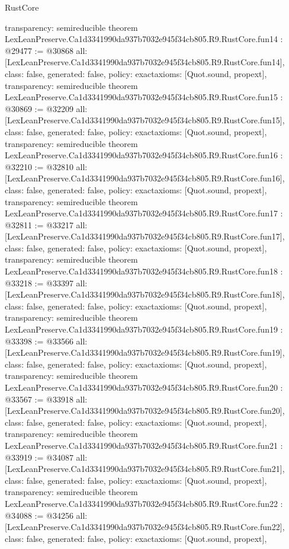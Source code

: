 \begin{lexlean}{RustCore}
\begin{coremodule}
{  transparency: semireducible
}
theorem LexLeanPreserve.Ca1d3341990da937b7032e945f34cb805.R9.RustCore.fun14 : @29477 := @30868 {
  all: [LexLeanPreserve.Ca1d3341990da937b7032e945f34cb805.R9.RustCore.fun14],
  class: false,
  generated: false,
  policy: exact{axioms: [Quot.sound, propext]},
  transparency: semireducible
}
theorem LexLeanPreserve.Ca1d3341990da937b7032e945f34cb805.R9.RustCore.fun15 : @30869 := @32209 {
  all: [LexLeanPreserve.Ca1d3341990da937b7032e945f34cb805.R9.RustCore.fun15],
  class: false,
  generated: false,
  policy: exact{axioms: [Quot.sound, propext]},
  transparency: semireducible
}
theorem LexLeanPreserve.Ca1d3341990da937b7032e945f34cb805.R9.RustCore.fun16 : @32210 := @32810 {
  all: [LexLeanPreserve.Ca1d3341990da937b7032e945f34cb805.R9.RustCore.fun16],
  class: false,
  generated: false,
  policy: exact{axioms: [Quot.sound, propext]},
  transparency: semireducible
}
theorem LexLeanPreserve.Ca1d3341990da937b7032e945f34cb805.R9.RustCore.fun17 : @32811 := @33217 {
  all: [LexLeanPreserve.Ca1d3341990da937b7032e945f34cb805.R9.RustCore.fun17],
  class: false,
  generated: false,
  policy: exact{axioms: [Quot.sound, propext]},
  transparency: semireducible
}
theorem LexLeanPreserve.Ca1d3341990da937b7032e945f34cb805.R9.RustCore.fun18 : @33218 := @33397 {
  all: [LexLeanPreserve.Ca1d3341990da937b7032e945f34cb805.R9.RustCore.fun18],
  class: false,
  generated: false,
  policy: exact{axioms: [Quot.sound, propext]},
  transparency: semireducible
}
theorem LexLeanPreserve.Ca1d3341990da937b7032e945f34cb805.R9.RustCore.fun19 : @33398 := @33566 {
  all: [LexLeanPreserve.Ca1d3341990da937b7032e945f34cb805.R9.RustCore.fun19],
  class: false,
  generated: false,
  policy: exact{axioms: [Quot.sound, propext]},
  transparency: semireducible
}
theorem LexLeanPreserve.Ca1d3341990da937b7032e945f34cb805.R9.RustCore.fun20 : @33567 := @33918 {
  all: [LexLeanPreserve.Ca1d3341990da937b7032e945f34cb805.R9.RustCore.fun20],
  class: false,
  generated: false,
  policy: exact{axioms: [Quot.sound, propext]},
  transparency: semireducible
}
theorem LexLeanPreserve.Ca1d3341990da937b7032e945f34cb805.R9.RustCore.fun21 : @33919 := @34087 {
  all: [LexLeanPreserve.Ca1d3341990da937b7032e945f34cb805.R9.RustCore.fun21],
  class: false,
  generated: false,
  policy: exact{axioms: [Quot.sound, propext]},
  transparency: semireducible
}
theorem LexLeanPreserve.Ca1d3341990da937b7032e945f34cb805.R9.RustCore.fun22 : @34088 := @34256 {
  all: [LexLeanPreserve.Ca1d3341990da937b7032e945f34cb805.R9.RustCore.fun22],
  class: false,
  generated: false,
  policy: exact{axioms: [Quot.sound, propext]},
}
\end{coremodule}
\end{lexlean}
